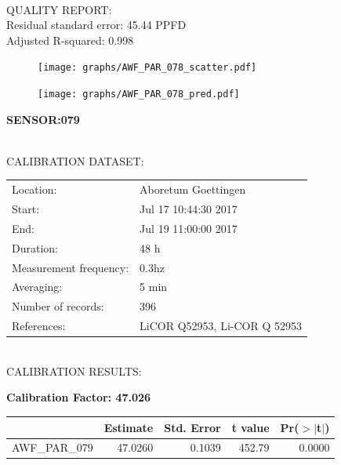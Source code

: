 \documentclass[oneside]{report}
\begin{document}
\hrulefill\\
QUALITY REPORT:\\
Residual standard error: 45.44 PPFD\\
Adjusted R-squared: 0.998



\begin{figure}[H]
  \centering
  \texttt{[image: graphs/AWF\_PAR\_078\_scatter.pdf]}
\end{figure}




\begin{figure}[H]
  \centering
  \texttt{[image: graphs/AWF\_PAR\_078\_pred.pdf]}
\end{figure}

\pagebreak


\begin{center}
\large{\textbf{SENSOR:079}}\\
\end{center}

\hrulefill\\
CALIBRATION DATASET:\\
\begin{table}[h!]
  \centering
  \label{tab:table1}
  \begin{tabular}{ll}
    Location: & Aboretum Goettingen\\ 
    
    
    Start:  & Jul 17 10:44:30 2017 \\
    End:   & Jul 19 11:00:00 2017\\ 
    Duration: & 48 h\\
    Measurement frequency: & 0.3hz\\
    Averaging:  &5 min\\
    Number of records: & 396 \\
    References: & LiCOR Q52953, Li-COR Q 52953 \\
  \end{tabular}
\end{table}

\hrulefill\\
CALIBRATION RESULTS:\\


\begin{center}
\textbf{\large{Calibration Factor: 47.026}}\\
\end{center}
\begin{table}[ht]
\centering
\begin{tabular}{rrrrr}
  \hline
 & Estimate & Std. Error & t value & Pr($>$$|$t$|$) \\ 
  \hline
AWF\_PAR\_079 & 47.0260 & 0.1039 & 452.79 & 0.0000 \\ 
   \hline
\end{tabular}
\end{table}
\end{document}

